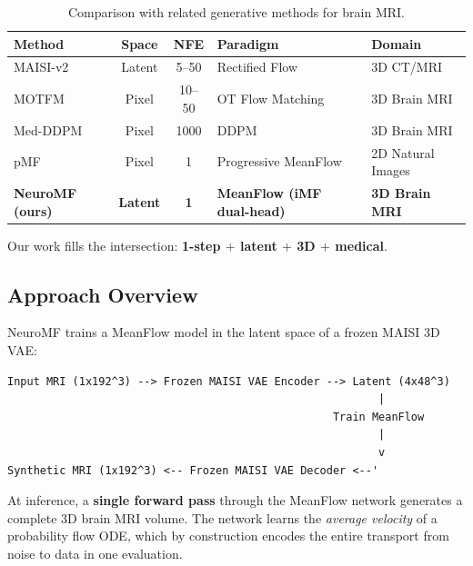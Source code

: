 \documentclass[11pt,a4paper]{article}
\begin{document}
\begin{table}[ht]
\centering
\caption{Comparison with related generative methods for brain MRI.}
\label{tab:literature}
\begin{tabular}{lccll}
\toprule
\textbf{Method} & \textbf{Space} & \textbf{NFE} & \textbf{Paradigm} & \textbf{Domain} \\
\midrule
MAISI-v2 \cite{maisi_v2}    & Latent & 5--50   & Rectified Flow       & 3D CT/MRI \\
MOTFM \cite{motfm}          & Pixel  & 10--50  & OT Flow Matching     & 3D Brain MRI \\
Med-DDPM \cite{medddpm}     & Pixel  & 1000    & DDPM                 & 3D Brain MRI \\
pMF \cite{pmf}              & Pixel  & 1       & Progressive MeanFlow & 2D Natural Images \\
\textbf{NeuroMF (ours)}     & \textbf{Latent} & \textbf{1} & \textbf{MeanFlow (iMF dual-head)} & \textbf{3D Brain MRI} \\
\bottomrule
\end{tabular}
\end{table}

Our work fills the intersection: \textbf{1-step $+$ latent $+$ 3D $+$ medical}.

\subsection{Approach Overview}

NeuroMF trains a MeanFlow model in the latent space of a frozen MAISI 3D VAE:
\begin{center}
\begin{BVerbatim}
Input MRI (1x192^3) --> Frozen MAISI VAE Encoder --> Latent (4x48^3)
                                                         |
                                                  Train MeanFlow
                                                         |
                                                         v
Synthetic MRI (1x192^3) <-- Frozen MAISI VAE Decoder <--'
\end{BVerbatim}
\end{center}

At inference, a \textbf{single forward pass} through the MeanFlow network
generates a complete 3D brain MRI volume.  The network learns the
\emph{average velocity} of a probability flow ODE, which by construction
encodes the entire transport from noise to data in one evaluation.


\end{document}
